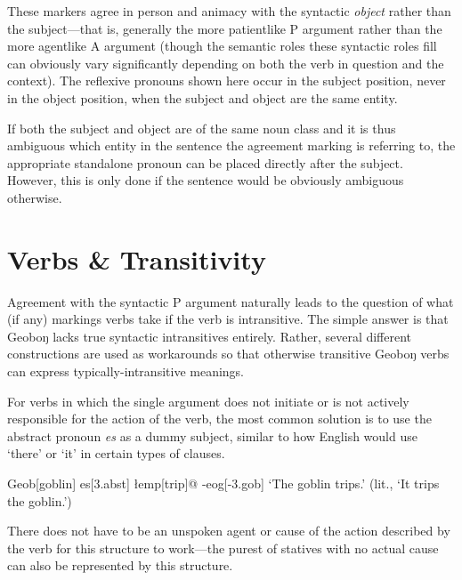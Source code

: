 \documentclass[a4paper,11pt,oneside,openany]{memoir}
\begin{document}
These markers agree in person and animacy with the syntactic \emph{object} rather than the subject---that is, generally the more patientlike P argument rather than the more agentlike A argument (though the semantic roles these syntactic roles fill can obviously vary significantly depending on both the verb in question and the context). The reflexive pronouns shown here occur in the subject position, never in the object position, when the subject and object are the same entity.

If both the subject and object are of the same noun class and it is thus ambiguous which entity in the sentence the agreement marking is referring to, the appropriate standalone pronoun can be placed directly after the subject. However, this is only done if the sentence would be obviously ambiguous otherwise.


\section{Verbs \& Transitivity}

Agreement with the syntactic P argument naturally leads to the question of what (if any) markings verbs take if the verb is intransitive. The simple answer is that Geoboŋ lacks true syntactic intransitives entirely. Rather, several different constructions are used as workarounds so that otherwise transitive Geoboŋ verbs can express typically-intransitive meanings.

For verbs in which the single argument does not initiate or is not actively responsible for the action of the verb, the most common solution is to use the abstract pronoun \textit{es} as a dummy subject, similar to how English would use `there' or `it' in certain types of clauses. 

\ex 
\begingl
Geob[goblin]
es[\sc 3.abst] 
\l emp[trip]@
-eog[\sc -3.gob]
\glft `The goblin trips.' (lit., `It trips the goblin.')
\endgl
\xe

There does not have to be an unspoken agent or cause of the action described by the verb for this structure to work---the purest of statives with no actual cause can also be represented by this structure.
\end{document}
